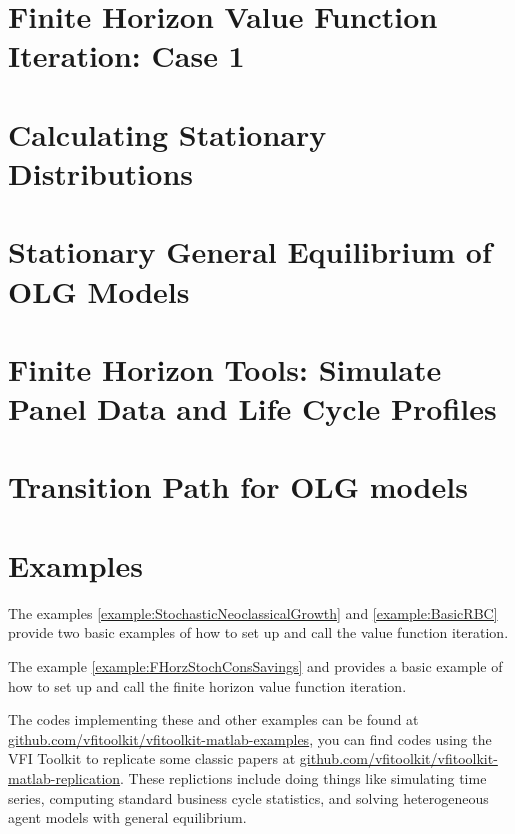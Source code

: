 \documentclass[11pt,fleqn]{article}
\begin{document}
\newpage
\section{Finite Horizon Value Function Iteration: Case 1} \label{sec:VFI_Case1_FHorz}


\section{Calculating Stationary Distributions}



\section{Stationary General Equilibrium of OLG Models} \label{sec:OLGmodel_GE}


\newpage
\section{Finite Horizon Tools: Simulate Panel Data and Life Cycle Profiles} \label{sec:FHorz_PanelLifeCycle}


\newpage
\section{Transition Path for OLG models}


% 

\newpage
\section{Examples} \label{sec:examples}
The examples \ref{example:StochasticNeoclassicalGrowth} and \ref{example:BasicRBC} provide two basic examples of how to set up and call the value function iteration.

The example \ref{example:FHorzStochConsSavings} and provides a basic example of how to set up and call the finite horizon value function iteration.

The codes implementing these and other examples can be found at \href{https://github.com/vfitoolkit/vfitoolkit-matlab-examples}{github.com/vfitoolkit/vfitoolkit-matlab-examples}, you can find codes using the VFI Toolkit to replicate some classic papers at \href{https://github.com/vfitoolkit/vfitoolkit-matlab-replication}{github.com/vfitoolkit/vfitoolkit-matlab-replication}.
These replictions include doing things like simulating time series, computing standard business cycle statistics, and solving heterogeneous agent models with general equilibrium.
\end{document}
